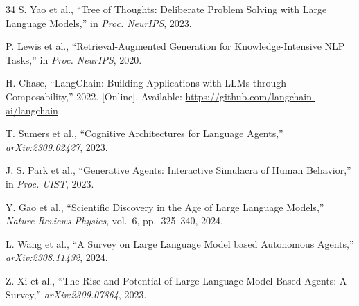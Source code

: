 \documentclass[review]{elsarticle}
\begin{document}
\begin{thebibliography}{34}
S. Yao et al., ``Tree of Thoughts: Deliberate Problem Solving with Large Language Models,'' in \textit{Proc. NeurIPS}, 2023.

P. Lewis et al., ``Retrieval-Augmented Generation for Knowledge-Intensive NLP Tasks,'' in \textit{Proc. NeurIPS}, 2020.

H. Chase, ``LangChain: Building Applications with LLMs through Composability,'' 2022. [Online]. Available: \url{https://github.com/langchain-ai/langchain}

T. Sumers et al., ``Cognitive Architectures for Language Agents,'' \textit{arXiv:2309.02427}, 2023.

J. S. Park et al., ``Generative Agents: Interactive Simulacra of Human Behavior,'' in \textit{Proc. UIST}, 2023.

Y. Gao et al., ``Scientific Discovery in the Age of Large Language Models,'' \textit{Nature Reviews Physics}, vol.~6, pp.~325--340, 2024.

L. Wang et al., ``A Survey on Large Language Model based Autonomous Agents,'' \textit{arXiv:2308.11432}, 2024.

Z. Xi et al., ``The Rise and Potential of Large Language Model Based Agents: A Survey,'' \textit{arXiv:2309.07864}, 2023.

\end{thebibliography}
\end{document}
